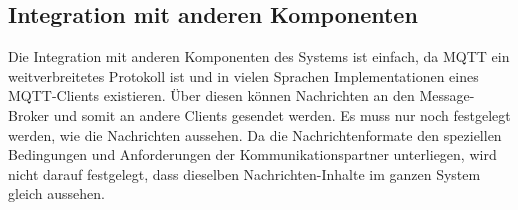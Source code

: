 \subsection{Integration mit anderen Komponenten}
Die Integration mit anderen Komponenten des Systems ist einfach, da MQTT ein weitverbreitetes Protokoll ist und in vielen Sprachen Implementationen eines MQTT-Clients existieren. Über diesen können Nachrichten an den Message-Broker und somit an andere Clients gesendet werden. Es muss nur noch festgelegt werden, wie die Nachrichten aussehen. Da die Nachrichtenformate den speziellen Bedingungen und Anforderungen der Kommunikationspartner unterliegen, wird nicht darauf festgelegt, dass dieselben Nachrichten-Inhalte im ganzen System gleich aussehen.
